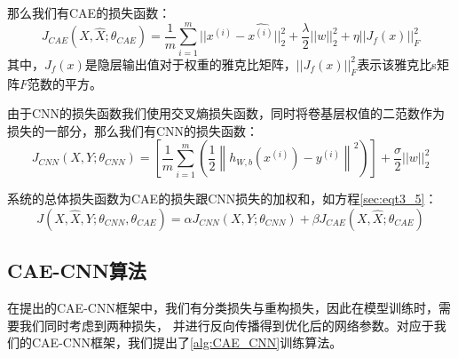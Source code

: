 那么我们有CAE的损失函数：
\begin{equation}\label{sec:eqt3_3}
	J_{CAE}(X, \hat{X}; \theta_{CAE}) = 
	\frac{1}{m}\sum_{i=1}^{m}||x^{(i)} - \hat{x^{(i)}}||_2^2  
	+ \frac{\lambda}{2}||w||_2^2 
	+ \eta||J_f(x)||_F^2
\end{equation}
其中，$J_f(x)$是隐层输出值对于权重的雅克比矩阵，$||J_f(x)||_F^2$表示该雅克比s矩阵$F$范数的平方。\par

由于CNN的损失函数我们使用交叉熵损失函数，同时将卷基层权值的二范数作为损失的一部分，那么我们有CNN的损失函数：
\begin{equation}\label{sec:eqt3_4}
	J_{CNN}(X, Y; \theta_{CNN}) = 
	\left[ \frac{1}{m} \sum_{i=1}^m \left( \frac{1}{2} \left\| h_{W,b}(x^{(i)}) - y^{(i)} \right\|^2 \right) \right]
	+ \frac{\sigma}{2} ||w||_2^2
\end{equation}

系统的总体损失函数为CAE的损失跟CNN损失的加权和，如方程\eqref{sec:eqt3_5}：
\begin{equation}\label{sec:eqt3_5}
	J(X, \hat{X}, Y; \theta_{CNN}, \theta_{CAE}) = 
		\alpha J_{CNN}(X, Y; \theta_{CNN}) 
		+ \beta J_{CAE}(X, \hat{X}; \theta_{CAE})
\end{equation}

\subsection{CAE-CNN算法}
在提出的CAE-CNN框架中，我们有分类损失与重构损失，因此在模型训练时，需要我们同时考虑到两种损失，
并进行反向传播得到优化后的网络参数。对应于我们的CAE-CNN框架，我们提出了\ref{alg:CAE_CNN}训练算法。

